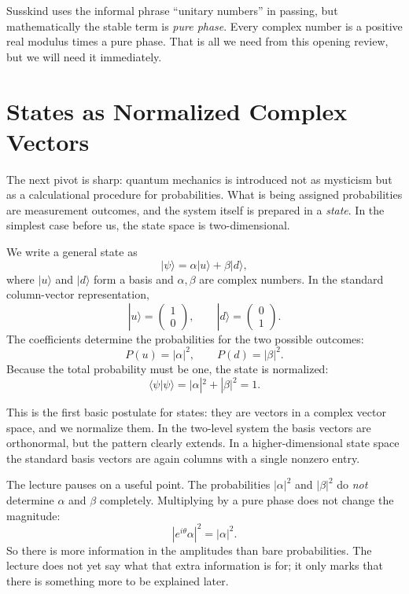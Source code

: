 Susskind uses the informal phrase ``unitary numbers'' in passing, but mathematically the stable term is \emph{pure phase}. Every complex number is a positive real modulus times a pure phase. That is all we need from this opening review, but we will need it immediately.

\section{States as Normalized Complex Vectors}

The next pivot is sharp: quantum mechanics is introduced not as mysticism but as a calculational procedure for probabilities. What is being assigned probabilities are measurement outcomes, and the system itself is prepared in a \emph{state}. In the simplest case before us, the state space is two-dimensional.

We write a general state as
\begin{equation}
|\psi\rangle=\alpha|u\rangle+\beta|d\rangle,
\end{equation}
where \(|u\rangle\) and \(|d\rangle\) form a basis and \(\alpha,\beta\) are complex numbers. In the standard column-vector representation,
\begin{equation}
|u\rangle=\begin{pmatrix}1\\0\end{pmatrix},
\qquad
|d\rangle=\begin{pmatrix}0\\1\end{pmatrix}.
\end{equation}
The coefficients determine the probabilities for the two possible outcomes:
\begin{equation}
P(u)=|\alpha|^2,\qquad P(d)=|\beta|^2.
\end{equation}
Because the total probability must be one, the state is normalized:
\begin{equation}
\langle \psi|\psi\rangle=|\alpha|^2+|\beta|^2=1.
\end{equation}

This is the first basic postulate for states: they are vectors in a complex vector space, and we normalize them. In the two-level system the basis vectors are orthonormal, but the pattern clearly extends. In a higher-dimensional state space the standard basis vectors are again columns with a single nonzero entry.

The lecture pauses on a useful point. The probabilities \(|\alpha|^2\) and \(|\beta|^2\) do \emph{not} determine \(\alpha\) and \(\beta\) completely. Multiplying by a pure phase does not change the magnitude:
\begin{equation}
|e^{i\theta}\alpha|^2=|\alpha|^2.
\end{equation}
So there is more information in the amplitudes than bare probabilities. The lecture does not yet say what that extra information is for; it only marks that there is something more to be explained later.

